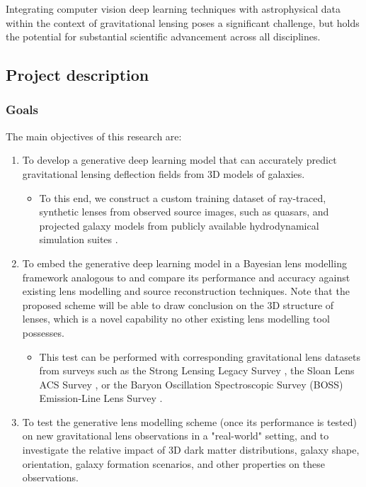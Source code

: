 \documentclass[a4paper,10pt]{article}
\begin{document}
Integrating computer vision deep learning techniques with
astrophysical data within the context of gravitational lensing poses a
significant challenge, but holds the potential for substantial
scientific advancement across all disciplines.

\subsection*{Project description}
\label{sec:orgf70a1b2}


\subsubsection*{Goals}
\label{sec:org128736e}

The main objectives of this research are:

\begin{enumerate}
\item To develop a generative deep learning model that can accurately
predict gravitational lensing deflection fields from 3D models of
galaxies.
\begin{itemize}
\item To this end, we construct a custom training dataset of
ray-traced, synthetic lenses from observed source images, such as
quasars, and projected galaxy models from publicly available
hydrodynamical simulation suites
\citep{Springel17,Nelson18,Dave19}.
\end{itemize}
\item To embed the generative deep learning model in a Bayesian lens
modelling framework analogous to
\cite{Adam22,Denzel21,Morningstar19,Hezaveh17} and compare
its performance and accuracy against existing lens modelling and
source reconstruction techniques. Note that the proposed scheme
will be able to draw conclusion on the 3D structure of lenses,
which is a novel capability no other existing lens modelling tool
possesses.
\begin{itemize}
\item This test can be performed with corresponding gravitational lens
datasets from surveys such as the Strong Lensing Legacy Survey
\citep[SL2S:][]{Gavazzi12,Sonnenfeld15}, the Sloan Lens ACS
Survey \citep[SLACS:][]{Bolton2006,Shu17}, or the Baryon
Oscillation Spectroscopic Survey (BOSS) Emission-Line Lens Survey
\citep[BELLS:][]{Brownstein11,Shu2016}.
\end{itemize}
\item To test the generative lens modelling scheme (once its performance
is tested) on new gravitational lens observations in a "real-world"
setting, and to investigate the relative impact of 3D dark matter
distributions, galaxy shape, orientation, galaxy formation
scenarios, and other properties on these observations.
\end{enumerate}
\end{document}
